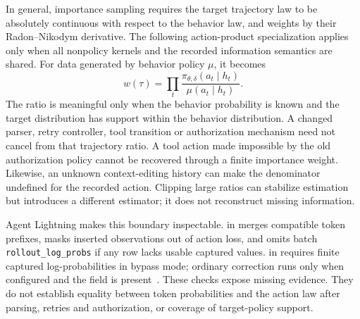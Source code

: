 In general, importance sampling requires the target trajectory law to be absolutely continuous with respect to the behavior law, and weights by their Radon--Nikodym derivative. The following action-product specialization applies only when all nonpolicy kernels and the recorded information semantics are shared. For data generated by behavior policy $\mu$, it becomes
\begin{equation}
 w(\tau)=\prod_t
 \frac{\pi_{\theta,\delta}(a_t\mid h_t)}{\mu(a_t\mid h_t)}.
\end{equation}
The ratio is meaningful only when the behavior probability is known and the target distribution has support within the behavior distribution. A changed parser, retry controller, tool transition or authorization mechanism need not cancel from that trajectory ratio. A tool action made impossible by the old authorization policy cannot be recovered through a finite importance weight. Likewise, an unknown context-editing history can make the denominator undefined for the recorded action. Clipping large ratios can stabilize estimation but introduces a different estimator; it does not reconstruct missing information.


Agent Lightning makes this boundary inspectable.  in  merges compatible token prefixes, masks inserted observations out of action loss, and omits batch \texttt{rollout\_log\_probs} if any row lacks usable captured values.  in  requires finite captured log-probabilities in bypass mode; ordinary correction runs only when configured and the field is present~\cite{ch01_lightning_code2026}. These checks expose missing evidence. They do not establish equality between token probabilities and the action law after parsing, retries and authorization, or coverage of target-policy support.
